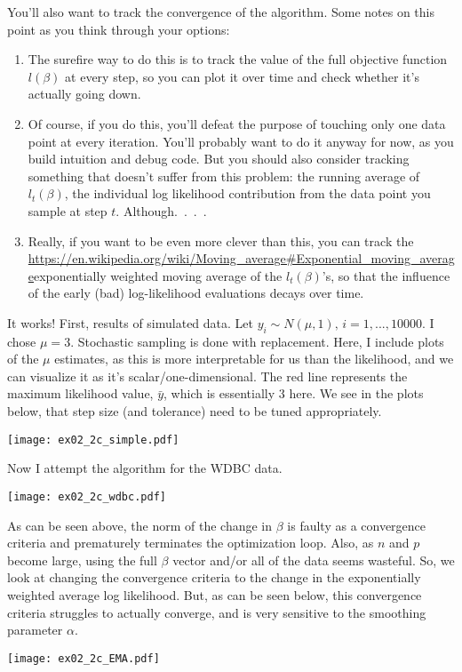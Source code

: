\documentclass{article}
\begin{document}
\begin{enumerate}[(A)]
You'll also want to track the convergence of the algorithm.  Some notes on this point as you think through your options:
\begin{enumerate}[1.]
\item The surefire way to do this is to track the value of the full objective function $l(\beta)$ at every step, so you can plot it over time and check whether it's actually going down.
\item Of course, if you do this, you'll defeat the purpose of touching only one data point at every iteration.  You'll probably want to do it anyway for now, as you build intuition and debug code.  But you should also consider tracking something that doesn't suffer from this problem: the running average of $l_t(\beta)$, the individual log likelihood contribution from the data point you sample at step $t$.  Although.~.~.~.
\item Really, if you want to be even more clever than this, you can track the \url{https://en.wikipedia.org/wiki/Moving_average#Exponential_moving_average}{exponentially weighted moving average} of the $l_t(\beta)$'s, so that the influence of the early (bad) log-likelihood evaluations decays over time.
\end{enumerate}

\color{blue}
It works! First, results of simulated data. Let $y_i \sim N(\mu, 1), \, i=1,...,10000$. I chose $\mu = 3$. Stochastic sampling is done with replacement. Here, I include plots of the $\mu$ estimates, as this is more interpretable for us than the likelihood, and we can visualize it as it's scalar/one-dimensional. The red line represents the maximum likelihood value, $\bar y$, which is essentially 3 here. We see in the plots below, that step size (and tolerance) need to be tuned appropriately. 
\begin{center}
\texttt{[image: ex02\_2c\_simple.pdf]}
\end{center}

Now I attempt the algorithm for the WDBC data. 

\begin{center}
\texttt{[image: ex02\_2c\_wdbc.pdf]}
\end{center}

As can be seen above, the norm of the change in $\beta$ is faulty as a convergence criteria and prematurely terminates the optimization loop. Also, as $n$ and $p$ become large, using the full $\beta$ vector and/or all of the data seems wasteful. So, we look at changing the convergence criteria to the change in the exponentially weighted average log likelihood. But, as can be seen below, this convergence criteria struggles to actually converge, and is very sensitive to the smoothing parameter $\alpha$. 
\begin{center}
\texttt{[image: ex02\_2c\_EMA.pdf]}
\end{center}
\color{black}


\end{enumerate}
\end{document}
